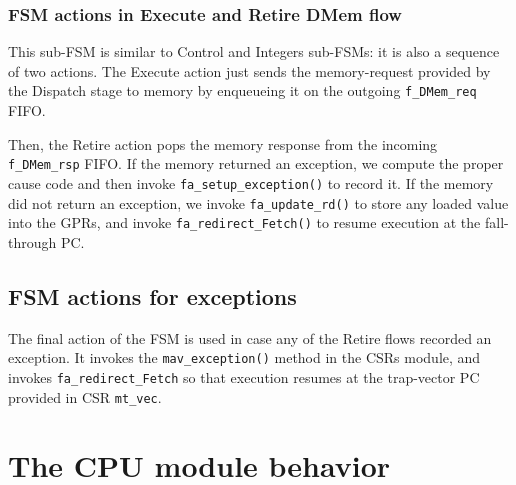 

\subsubsection{FSM actions in Execute and Retire DMem flow}

This sub-FSM is similar to Control and Integers sub-FSMs: it is also a
sequence of two actions.  The Execute action just sends the
memory-request provided by the Dispatch stage to memory by enqueueing
it on the outgoing \verb|f_DMem_req| FIFO.


Then, the Retire action pops the memory response from the incoming
\verb|f_DMem_rsp| FIFO.  If the memory returned an exception, we
compute the proper cause code and then invoke
\verb|fa_setup_exception()| to record it.  If the memory did not
return an exception, we invoke \verb|fa_update_rd()| to store any
loaded value into the GPRs, and invoke \verb|fa_redirect_Fetch()| to
resume execution at the fall-through PC.



\subsection{FSM actions for exceptions}

The final action of the {\DRUM} FSM is used in case any of the Retire
flows recorded an exception.  It invokes the \verb|mav_exception()|
method in the CSRs module, and invokes \verb|fa_redirect_Fetch| so
that execution resumes at the trap-vector PC provided in CSR
\verb|mt_vec|.



\section{The {\DRUM} CPU module behavior}

\label{Sec_Drum_CPU_module_behavior}


